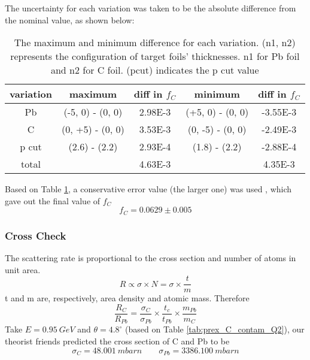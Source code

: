 The uncertainty for each variation was taken to be the absolute difference 
from the nominal value, as shown below:
\begin{table}
    \centering
    \begin{tabular}{c | c c | c c}
	\hline
	variation   & maximum	& diff in $f_C$  & minimum    & diff in $f_C$ \\
	\hline
	Pb & (-5, 0) - (0, 0)	& 2.98E-3   & (+5, 0) - (0, 0)	& -3.55E-3  \\
	C  & (0, +5) - (0, 0)	& 3.53E-3   & (0, -5) - (0, 0)	& -2.49E-3  \\
	p cut	& (2.6) - (2.2)	& 2.93E-4   & (1.8) - (2.2)	& -2.88E-4  \\
	\hline
	total	&   & 4.63E-3	&   & 4.35E-3	\\
	\hline
    \end{tabular}
    \caption{The maximum and minimum difference for each variation. (n1, n2) 
    represents the configuration of target foils' thicknesses. n1 for Pb foil
    and n2 for C foil. (pcut) indicates the p cut value}
    \label{tab:prex_C_contam_error}
\end{table}
Based on Table \ref{tab:prex_C_contam_error}, a conservative error value 
(the larger one) was used , which gave out the final value of $f_C$
\begin{equation*}
    f_C = 0.0629 \pm 0.005
\end{equation*}

\subsubsection{Cross Check}
The scattering rate is proportional to the cross section and number of atoms
in unit area. 
\begin{equation}
    R \propto \sigma \times N = \sigma \times \frac{t}{m}
\end{equation}
t and m are, respectively, area density and atomic mass. Therefore
\begin{equation}
    \frac{R_C}{R_{Pb}} = \frac{\sigma_C}{\sigma_{Pb}} \times \frac{t_c}{t_{Pb}} \times \frac{m_{Pb}}{m_C}
\end{equation}
Take $E = 0.95\ GeV$ and $\theta = 4.8^\circ$ (based on Table \ref{tab:prex_C_contam_Q2}), 
our theorist friends predicted the cross section of C and Pb to be
\begin{equation*}
    \sigma_C = 48.001\ mbarn	\qquad \sigma_{Pb} = 3386.100\ mbarn	
\end{equation*}

